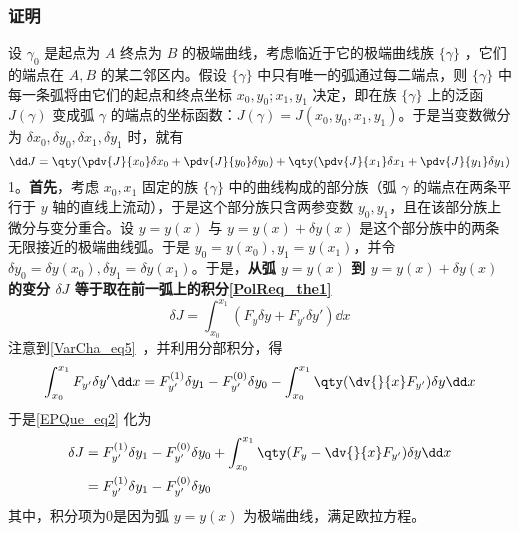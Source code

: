 \subsubsection{证明}
设 $\gamma_0$ 是起点为 $A$ 终点为 $B$ 的极端曲线，考虑临近于它的极端曲线族 $\{\gamma\}$ ，它们的端点在 $A,B$ 的某二邻区内。假设 $\{\gamma\}$ 中只有唯一的弧通过每二端点，则 $\{\gamma\}$ 中每一条弧将由它们的起点和终点坐标 $x_0,y_0;x_1,y_1$ 决定，即在族 $\{\gamma\}$ 上的泛函 $J(\gamma)$ 变成弧 $\gamma$ 的端点的坐标函数：$J(\gamma)=J(x_0,y_0,x_1,y_1)$。于是当变数微分为 $\delta x_0,\delta y_0,\delta x_1,\delta y_1$ 时，就有
\begin{equation}
\dd J=\qty(\pdv{J}{x_0}\delta x_0+\pdv{J}{y_0}\delta y_0)+\qty(\pdv{J}{x_1}\delta x_1+\pdv{J}{y_1}\delta y_1)
\end{equation}
1。\textbf{首先}，考虑 $x_0,x_1$ 固定的族 $\{\gamma\}$ 中的曲线构成的部分族（弧 $\gamma$ 的端点在两条平行于 $y$ 轴的直线上流动），于是这个部分族只含两参变数 $y_0,y_1$，且在该部分族上微分与变分重合。设 $y=y(x)$ 与 $y=y(x)+\delta y(x)$ 是这个部分族中的两条无限接近的极端曲线弧。于是 $y_0=y(x_0),y_1=y(x_1)$，并令 $\delta y_0=\delta y(x_0),\delta y_1=\delta y(x_1)$。于是，\textbf{从弧 $y=y(x)$ 到 $y=y(x)+\delta y(x)$ 的变分 $\delta J$ 等于取在前一弧上的积分\autoref{PolReq_the1}~}
\begin{equation}\label{EPQue_eq2}
\delta J=\int_{x_0}^{x_1}(F_{y}\delta y+F_{y'}\delta y')\dd x
\end{equation}
注意到\autoref{VarCha_eq5}~，并利用分部积分，得
\begin{equation}
\int_{x_0}^{x_1}F_{y'}\delta y' \dd x=F_{y'}^{(1)}\delta y_1-F_{y'}^{(0)}\delta y_0-\int_{x_0}^{x_1}\qty(\dv{}{x}F_{y'})\delta y\dd x
\end{equation}
于是\autoref{EPQue_eq2} 化为
\begin{equation}
\begin{aligned}
\delta J&=F_{y'}^{(1)}\delta y_1-F_{y'}^{(0)}\delta y_0+\int_{x_0}^{x_1}\qty(F_y-\dv{}{x}F_{y'})\delta y\dd x\\
&=F_{y'}^{(1)}\delta y_1-F_{y'}^{(0)}\delta y_0
\end{aligned}
\end{equation}
其中，积分项为0是因为弧 $y=y(x)$ 为极端曲线，满足欧拉方程。

